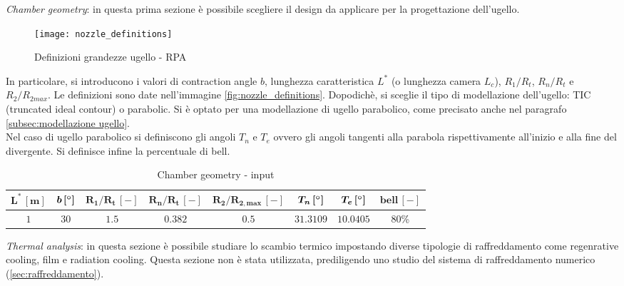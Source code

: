 \begin{itemize}

\parbox[t]{\dimexpr\textwidth-\leftmargin}{%
\item \textit{Chamber geometry}: in questa prima sezione è possibile scegliere il design da applicare per la progettazione dell'ugello.
\begin{wrapfigure}{r}{0.4\linewidth}
	\centering
	\vspace{-\baselineskip}
	\texttt{[image: nozzle\_definitions]}
	\caption{Definizioni grandezze ugello - RPA }
	\label{fig:nozzle_definitions}
\end{wrapfigure}
In particolare, si introducono i valori di contraction angle $b$, lunghezza caratteristica $L^*$ (o lunghezza camera $L_c$), $R_1/R_t$, $R_n/R_t$ e $R_2/R_{2max}$. Le definizioni sono date nell'immagine \autoref{fig:nozzle_definitions}. Dopodichè, si sceglie il tipo di modellazione dell'ugello: TIC (truncated ideal contour) o parabolic. Si è optato per una modellazione di ugello parabolico, come precisato anche nel paragrafo \autoref{subsec:modellazione ugello}. \\
Nel caso di ugello parabolico si definiscono gli angoli $T_n$ e $T_e$ ovvero gli angoli tangenti alla parabola rispettivamente all'inizio e alla fine del divergente. Si definisce infine la percentuale di bell.
\begin{table}[H]
\centering
\begin{tabular}{|c|c|c|c|c|c|c|c|}
\hline
$\bm{L^* \, [m]}$ & $\bm{b \, [\degree]}$ & $\bm{R_1/R_t \, [-]}$ & $\bm{R_n/R_t \, [-]}$ & $\bm{R_2/R_{2,max} \, [-]}$  & $\bm{T_n \, [\degree]}$ &  $\bm{T_e \, [\degree]}$ & $\bm{bell \, [-]}$ \\
\hline
$1$ & $30$ & $1.5$ & $0.382$ & $0.5$ & $31.3109$ & $10.0405$ & $80$\% \\
\hline
\end{tabular}
\caption{Chamber geometry - input}
\label{table:chamb_input}
\end{table}
}

\item \textit{Thermal analysis}: in questa sezione è possibile studiare lo scambio termico impostando diverse tipologie di raffreddamento come regenrative cooling, film e radiation cooling. Questa sezione non è stata utilizzata, prediligendo uno studio del sistema di raffreddamento numerico (\autoref{sec:raffreddamento}).


\end{itemize}
